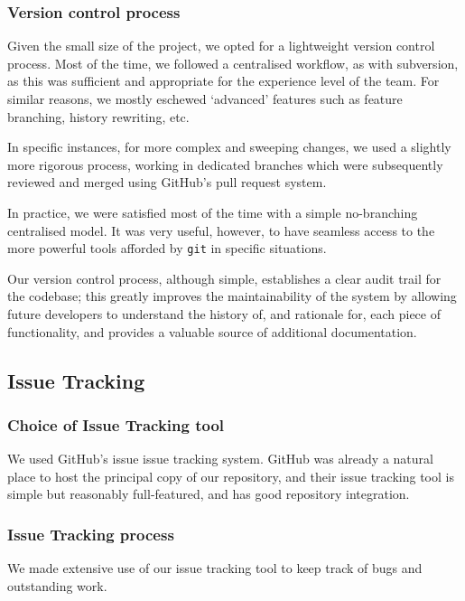 \subsubsection{Version control process}

Given the small size of the project, we opted for a lightweight
version control process. Most of the time, we followed a centralised
workflow, as with subversion, as this was sufficient and appropriate
for the experience level of the team. For similar reasons, we mostly
eschewed `advanced' features such as feature branching, history
rewriting, etc.

In specific instances, for more complex and sweeping changes, we used
a slightly more rigorous process, working in dedicated branches which
were subsequently reviewed and merged using GitHub's pull request
system.

In practice, we were satisfied most of the time with a simple
no-branching centralised model. It was very useful, however, to have
seamless access to the more powerful tools afforded by \texttt{git} in
specific situations.

Our version control process, although simple, establishes a clear
audit trail for the codebase; this greatly improves the
maintainability of the system by allowing future developers to
understand the history of, and rationale for, each piece of
functionality, and provides a valuable source of additional
documentation.

\subsection{Issue Tracking}

\subsubsection{Choice of Issue Tracking tool}

We used GitHub's issue issue tracking system. GitHub was already a
natural place to host the principal copy of our repository, and their
issue tracking tool is simple but reasonably full-featured, and
has good repository integration.

\subsubsection{Issue Tracking process}

We made extensive use of our issue tracking tool to keep track of bugs
and outstanding work.


